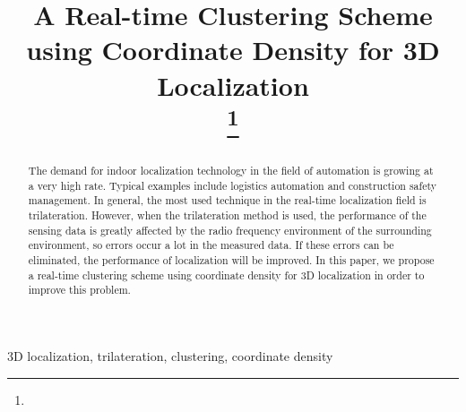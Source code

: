 \documentclass[conference]{IEEEtran}
\begin{document}
\title{A Real-time Clustering Scheme using Coordinate Density for 3D Localization\\
    \thanks{}}

\author{
    \and
}

\maketitle

\begin{abstract}
    The demand for indoor localization technology in the field of automation is growing at a very high rate. Typical examples include logistics automation and construction safety management. In general, the most used technique in the real-time localization field is trilateration. However, when the trilateration method is used, the performance of the sensing data is greatly affected by the radio frequency environment of the surrounding environment, so errors occur a lot in the measured data. If these errors can be eliminated, the performance of localization will be improved. In this paper, we propose a real-time clustering scheme using coordinate density for 3D localization in order to improve this problem.
\end{abstract}

\begin{IEEEkeywords}
    3D localization, trilateration, clustering, coordinate density
\end{IEEEkeywords}
\end{document}
